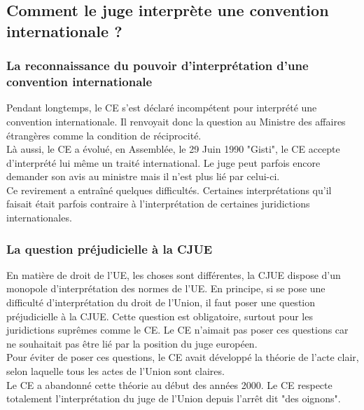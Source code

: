 \documentclass[10pt, a4paper, openany]{book}
\begin{document}
\subsection{Comment le juge interprète une convention internationale ?}

\subsubsection{La reconnaissance du pouvoir d'interprétation d'une convention internationale}

Pendant longtemps, le CE s'est déclaré incompétent pour interprété une convention internationale. Il renvoyait donc la question au Ministre des affaires étrangères comme la condition de réciprocité. \\
Là aussi, le CE a évolué, en Assemblée, le 29 Juin 1990 "Gisti", le CE accepte d'interprété lui même un traité international. Le juge peut parfois encore demander son avis au ministre mais il n'est plus lié par celui-ci. \\
Ce revirement a entraîné quelques difficultés. Certaines interprétations qu'il faisait était parfois contraire à l'interprétation de certaines juridictions internationales.

\subsubsection{La question préjudicielle à la CJUE}

En matière de droit de l'UE, les choses sont différentes, la CJUE dispose d'un monopole d'interprétation des normes de l'UE. En principe, si se pose une difficulté d'interprétation du droit de l'Union, il faut poser une question préjudicielle à la CJUE. Cette question est obligatoire, surtout pour les juridictions suprêmes comme le CE. Le CE n'aimait pas poser ces questions car ne souhaitait pas être lié par la position du juge européen. \\
Pour éviter de poser ces questions, le CE avait développé la théorie de l'acte clair, selon laquelle tous les actes de l'Union sont claires. \\
Le CE a abandonné cette théorie au début des années 2000. Le CE respecte totalement l'interprétation du juge de l'Union depuis l'arrêt dit "des oignons".
\end{document}
